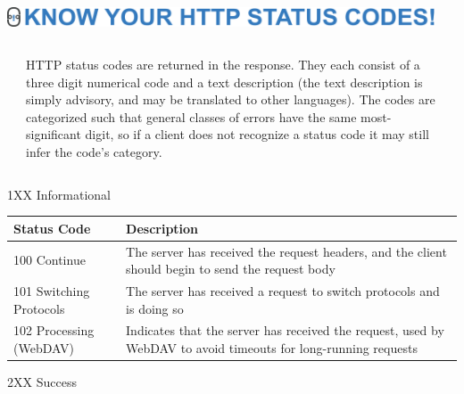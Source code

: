 \documentclass[final,table]{beamer}
\begin{document}
  \begin{frame}{}

    \begin{minipage}{\textwidth}
      \centering
      \includegraphics[width=0.95\textwidth]{./title-status-codes.pdf}
    \end{minipage}

    \vspace{0.5in}

    \begin{columns}
      \begin{column}{0.05\textwidth}
      \end{column}
      \begin{column}{0.9\textwidth}
        \begin{block}{}
          \large
            HTTP status codes are returned in the response. They each consist of
            a three digit numerical code and a text description (the text
            description is simply advisory, and may be translated to other
            languages). The codes are categorized such that general classes of
            errors have the same most-significant digit, so if a client does not
            recognize a status code it may still infer the code's category.
          \normalsize
        \end{block}
      \end{column}
      \begin{column}{0.05\textwidth}
      \end{column}
    \end{columns}

    \vspace{0.5in}

    \begin{block}{\huge 1XX Informational}

      \vspace{0.3in}

      \begin{tabular}{p{} p{}}
        Status Code & Description \\ \hline
        100 Continue & The server has received the request headers, and the client should begin to send the request body \\
        101 Switching Protocols & The server has received a request to switch protocols and is doing so \\
        102 Processing (WebDAV) & Indicates that the server has received the request, used by WebDAV to avoid timeouts for long-running requests \\
      \end{tabular}
    \end{block}
    \begin{block}{\huge 2XX Success}


\end{block}
\end{frame}
\end{document}
